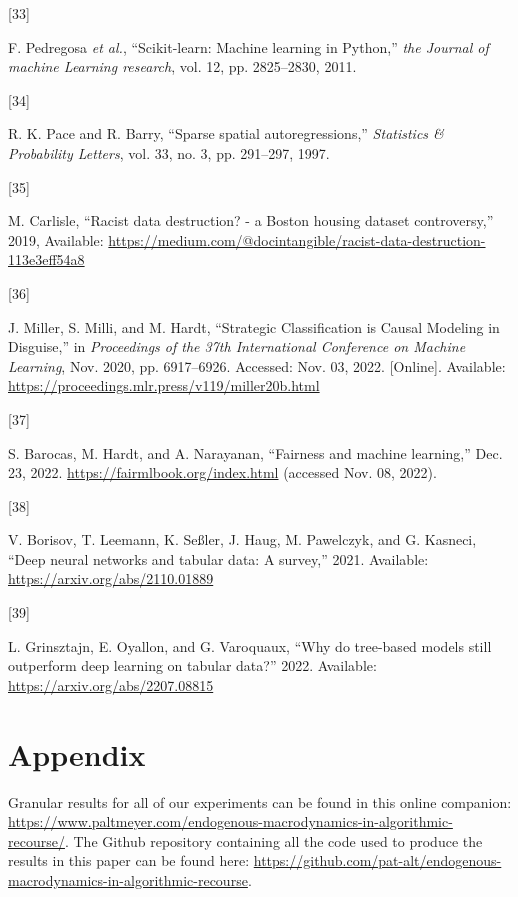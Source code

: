 \documentclass[conference,final,]{IEEEtran}
\newlength{\cslhangindent}
\newlength{\csllabelwidth}
\newlength{\cslentryspacingunit} %
\newenvironment{CSLReferences}[2] %
 {%
  \setlength{\parindent}{0pt}
  \ifodd #1
  \let\oldpar\par
  \def\par{\hangindent=\cslhangindent\oldpar}
  \fi
  \setlength{\parskip}{#2\cslentryspacingunit}
 }%
 {}
\newcommand{\CSLLeftMargin}[1]{\parbox[t]{\csllabelwidth}{#1}}
\newcommand{\CSLRightInline}[1]{\parbox[t]{\linewidth - \csllabelwidth}{#1}\break}
\theoremstyle{definition}
\theoremstyle{definition}
\theoremstyle{definition}
\theoremstyle{definition}
\theoremstyle{remark}
\begin{document}
\begin{CSLReferences}{0}{0}
\leavevmode{}%
\CSLLeftMargin{{[}33{]} }%
\CSLRightInline{F. Pedregosa \emph{et al.}, {``Scikit-learn: {Machine} learning in {Python},''} \emph{the Journal of machine Learning research}, vol. 12, pp. 2825--2830, 2011.}

\leavevmode{}%
\CSLLeftMargin{{[}34{]} }%
\CSLRightInline{R. K. Pace and R. Barry, {``Sparse spatial autoregressions,''} \emph{Statistics \& Probability Letters}, vol. 33, no. 3, pp. 291--297, 1997.}

\leavevmode{}%
\CSLLeftMargin{{[}35{]} }%
\CSLRightInline{M. Carlisle, {``Racist data destruction? - a {Boston} housing dataset controversy,''} 2019, Available: \url{https://medium.com/@docintangible/racist-data-destruction-113e3eff54a8}}

\leavevmode{}%
\CSLLeftMargin{{[}36{]} }%
\CSLRightInline{J. Miller, S. Milli, and M. Hardt, {``Strategic {Classification} is {Causal Modeling} in {Disguise},''} in \emph{Proceedings of the 37th {International Conference} on {Machine Learning}}, Nov. 2020, pp. 6917--6926. Accessed: Nov. 03, 2022. {[}Online{]}. Available: \url{https://proceedings.mlr.press/v119/miller20b.html}}

\leavevmode{}%
\CSLLeftMargin{{[}37{]} }%
\CSLRightInline{S. Barocas, M. Hardt, and A. Narayanan, {``Fairness and machine learning,''} Dec. 23, 2022. \url{https://fairmlbook.org/index.html} (accessed Nov. 08, 2022).}

\leavevmode{}%
\CSLLeftMargin{{[}38{]} }%
\CSLRightInline{V. Borisov, T. Leemann, K. Seßler, J. Haug, M. Pawelczyk, and G. Kasneci, {``Deep neural networks and tabular data: {A} survey,''} 2021. Available: \url{https://arxiv.org/abs/2110.01889}}

\leavevmode{}%
\CSLLeftMargin{{[}39{]} }%
\CSLRightInline{L. Grinsztajn, E. Oyallon, and G. Varoquaux, {``Why do tree-based models still outperform deep learning on tabular data?''} 2022. Available: \url{https://arxiv.org/abs/2207.08815}}

\end{CSLReferences}

\newpage

\hypertarget{appendix}{%
\section*{Appendix}\label{appendix}}

Granular results for all of our experiments can be found in this online companion: \url{https://www.paltmeyer.com/endogenous-macrodynamics-in-algorithmic-recourse/}. The Github repository containing all the code used to produce the results in this paper can be found here: \url{https://github.com/pat-alt/endogenous-macrodynamics-in-algorithmic-recourse}.
\end{document}
